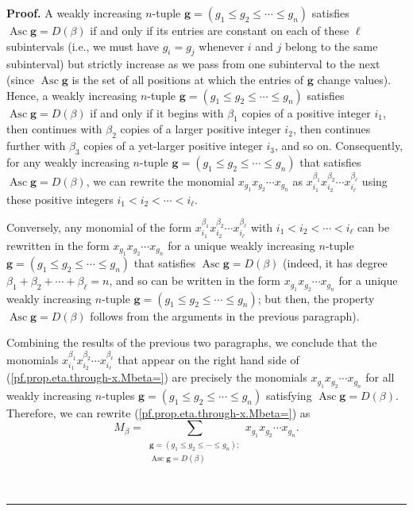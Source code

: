 \documentclass[numbers=enddot,12pt,final,onecolumn,notitlepage]{scrartcl}%
\theoremstyle{definition}
\newenvironment{proof}[1][Proof]{\noindent\textbf{#1.} }{\ \rule{0.5em}{0.5em}}
\let\sumnonlimits\sum
\renewcommand{\sum}{\sumnonlimits\limits}
\newenvironment{vershort}{}{}
\begin{document}
\begin{vershort}
\begin{proof}
A weakly increasing $n$-tuple $\mathbf{g}=\left(  g_{1}\leq g_{2}\leq
\cdots\leq g_{n}\right)  $ satisfies $\operatorname*{Asc}\mathbf{g}=D\left(
\beta\right)  $ if and only if its entries are constant on each of these
$\ell$ subintervals (i.e., we must have $g_{i}=g_{j}$ whenever $i$ and $j$
belong to the same subinterval) but strictly increase as we pass from one
subinterval to the next (since $\operatorname*{Asc}\mathbf{g}$ is the set of
all positions at which the entries of $\mathbf{g}$ change values). Hence, a
weakly increasing $n$-tuple $\mathbf{g}=\left(  g_{1}\leq g_{2}\leq\cdots\leq
g_{n}\right)  $ satisfies $\operatorname*{Asc}\mathbf{g}=D\left(
\beta\right)  $ if and only if it begins with $\beta_{1}$ copies of a positive
integer $i_{1}$, then continues with $\beta_{2}$ copies of a larger positive
integer $i_{2}$, then continues further with $\beta_{3}$ copies of a
yet-larger positive integer $i_{3}$, and so on. Consequently, for any weakly
increasing $n$-tuple $\mathbf{g}=\left(  g_{1}\leq g_{2}\leq\cdots\leq
g_{n}\right)  $ that satisfies $\operatorname*{Asc}\mathbf{g}=D\left(
\beta\right)  $, we can rewrite the monomial $x_{g_{1}}x_{g_{2}}\cdots
x_{g_{n}}$ as $x_{i_{1}}^{\beta_{1}}x_{i_{2}}^{\beta_{2}}\cdots x_{i_{\ell}%
}^{\beta_{\ell}}$ using these positive integers $i_{1}<i_{2}<\cdots<i_{\ell}$.

Conversely, any monomial of the form $x_{i_{1}}^{\beta_{1}}x_{i_{2}}%
^{\beta_{2}}\cdots x_{i_{\ell}}^{\beta_{\ell}}$ with $i_{1}<i_{2}%
<\cdots<i_{\ell}$ can be rewritten in the form $x_{g_{1}}x_{g_{2}}\cdots
x_{g_{n}}$ for a unique weakly increasing $n$-tuple $\mathbf{g}=\left(
g_{1}\leq g_{2}\leq\cdots\leq g_{n}\right)  $ that satisfies
$\operatorname*{Asc}\mathbf{g}=D\left(  \beta\right)  $ (indeed, it has degree
$\beta_{1}+\beta_{2}+\cdots+\beta_{\ell}=n$, and so can be written in the form
$x_{g_{1}}x_{g_{2}}\cdots x_{g_{n}}$ for a unique weakly increasing $n$-tuple
$\mathbf{g}=\left(  g_{1}\leq g_{2}\leq\cdots\leq g_{n}\right)  $; but then,
the property $\operatorname*{Asc}\mathbf{g}=D\left(  \beta\right)  $ follows
from the arguments in the previous paragraph).

Combining the results of the previous two paragraphs, we conclude that the
monomials $x_{i_{1}}^{\beta_{1}}x_{i_{2}}^{\beta_{2}}\cdots x_{i_{\ell}%
}^{\beta_{\ell}}$ that appear on the right hand side of
(\ref{pf.prop.eta.through-x.Mbeta=}) are precisely the monomials $x_{g_{1}%
}x_{g_{2}}\cdots x_{g_{n}}$ for all weakly increasing $n$-tuples
$\mathbf{g}=\left(  g_{1}\leq g_{2}\leq\cdots\leq g_{n}\right)  $ satisfying
$\operatorname*{Asc}\mathbf{g}=D\left(  \beta\right)  $. Therefore, we can
rewrite (\ref{pf.prop.eta.through-x.Mbeta=}) as%
\begin{equation}
M_{\beta}=\sum_{\substack{\mathbf{g}=\left(  g_{1}\leq g_{2}\leq\cdots\leq
g_{n}\right)  ;\\\operatorname*{Asc}\mathbf{g}=D\left(  \beta\right)
}}x_{g_{1}}x_{g_{2}}\cdots x_{g_{n}}. \label{pf.prop.eta.through-x.Mbeta=2}%
\end{equation}



\end{proof}
\end{vershort}
\end{document}
